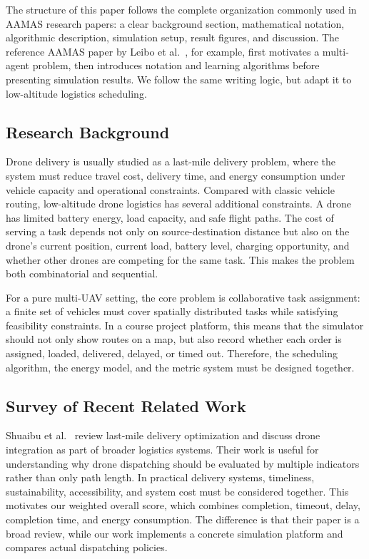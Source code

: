 \documentclass[sigconf,balance=false]{aamas}
\begin{document}
The structure of this paper follows the complete organization commonly used in AAMAS research papers: a clear background section, mathematical notation, algorithmic description, simulation setup, result figures, and discussion. The reference AAMAS paper by Leibo et al.~\cite{leibo2017ssd}, for example, first motivates a multi-agent problem, then introduces notation and learning algorithms before presenting simulation results. We follow the same writing logic, but adapt it to low-altitude logistics scheduling.

\subsection{Research Background}

Drone delivery is usually studied as a last-mile delivery problem, where the system must reduce travel cost, delivery time, and energy consumption under vehicle capacity and operational constraints. Compared with classic vehicle routing, low-altitude drone logistics has several additional constraints. A drone has limited battery energy, load capacity, and safe flight paths. The cost of serving a task depends not only on source-destination distance but also on the drone's current position, current load, battery level, charging opportunity, and whether other drones are competing for the same task. This makes the problem both combinatorial and sequential.

For a pure multi-UAV setting, the core problem is collaborative task assignment: a finite set of vehicles must cover spatially distributed tasks while satisfying feasibility constraints. In a course project platform, this means that the simulator should not only show routes on a map, but also record whether each order is assigned, loaded, delivered, delayed, or timed out. Therefore, the scheduling algorithm, the energy model, and the metric system must be designed together.

\subsection{Survey of Recent Related Work}

Shuaibu et al.~\cite{lmdreview2025} review last-mile delivery optimization and discuss drone integration as part of broader logistics systems. Their work is useful for understanding why drone dispatching should be evaluated by multiple indicators rather than only path length. In practical delivery systems, timeliness, sustainability, accessibility, and system cost must be considered together. This motivates our weighted overall score, which combines completion, timeout, delay, completion time, and energy consumption. The difference is that their paper is a broad review, while our work implements a concrete simulation platform and compares actual dispatching policies.
\end{document}
